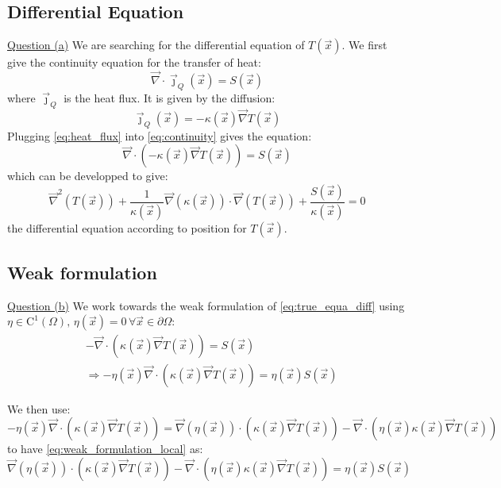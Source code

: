 \subsection{Differential Equation}
\underline{Question (a)}
We are searching for the differential equation of $T(\vec{x})$. We first give the continuity equation for the transfer of heat:
\begin{equation}
    \vec{\nabla} \cdot \vec{\jmath}_Q(\vec{x}) = S(\vec{x})
    \label{eq:continuity}
\end{equation}
where $\vec{\jmath}_Q$ is the heat flux. It is given by the diffusion:
\begin{equation}
    \vec{\jmath}_Q(\vec{x}) = -\kappa (\vec{x}) \vec{\nabla}T(\vec{x})
    \label{eq:heat_flux}
\end{equation}
Plugging \autoref{eq:heat_flux} into \autoref{eq:continuity} gives the equation:
\begin{equation}
    \vec{\nabla} \cdot (-\kappa(\vec{x})\vec{\nabla}T(\vec{x})) = S(\vec{x})
    \label{eq:true_equa_diff}
\end{equation}
which can be developped to give:
\begin{equation}
    \vec{\nabla}^2(T(\vec{x})) + \frac{1}{\kappa(\vec{x})} \vec{\nabla}(\kappa(\vec{x})) \cdot \vec{\nabla}(T(\vec{x})) + \frac{S(\vec{x})}{\kappa(\vec{x})} = 0
    \label{eq:equa_diff_T}
\end{equation}
the differential equation according to position for $T(\vec{x})$.

\subsection{Weak formulation}
\underline{Question (b)}
We work towards the weak formulation of \autoref{eq:true_equa_diff} using \mbox{$\eta \in \mathrm{C}^1(\Omega), \, \eta(\vec{x}) = 0 \,\forall \vec{x} \in \partial\Omega$}:
\begin{equation}
    \begin{aligned}
        & -\vec{\nabla} \cdot (\kappa(\vec{x})\vec{\nabla}T(\vec{x})) = S(\vec{x}) \\
        & \Rightarrow -\eta(\vec{x}) \vec{\nabla} \cdot (\kappa(\vec{x})\vec{\nabla}T(\vec{x})) = \eta(\vec{x}) S(\vec{x})
    \end{aligned}
    \label{eq:weak_formulation_local}
\end{equation}

We then use:
\begin{equation}
    -\eta(\vec{x})\vec{\nabla}\cdot(\kappa(\vec{x})\vec{\nabla}T(\vec{x})) = \vec{\nabla}(\eta(\vec{x}))\cdot(\kappa(\vec{x})\vec{\nabla}T(\vec{x})) - \vec{\nabla}\cdot(\eta(\vec{x})\kappa(\vec{x})\vec{\nabla}T(\vec{x}))
\end{equation}
to have \autoref{eq:weak_formulation_local} as:
\begin{equation}
    \vec{\nabla}(\eta(\vec{x}))\cdot(\kappa(\vec{x})\vec{\nabla}T(\vec{x})) - \vec{\nabla}\cdot(\eta(\vec{x})\kappa(\vec{x})\vec{\nabla}T(\vec{x})) = \eta(\vec{x})S(\vec{x})
\end{equation}

